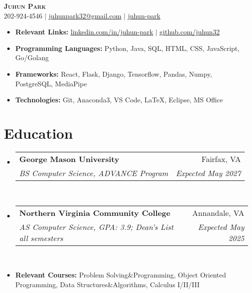 \documentclass[letterpaper,11pt]{article}
\makeatletter
\newcommand{\resumeItem}[1]{
  \item\small{
    {#1 \vspace{-3pt}}
  }
}
\newcommand{\resumeItemThin}[1]{
  \item\small{
    {#1 \vspace{-7pt}}
  }
}
\newcommand{\resumeSubheading}[4]{
    \item
    \begin{tabular*}{0.97\textwidth}[t]{l@{\extracolsep{\fill}}r@{\hspace{-0.2in}}}
        \small{\textbf{#1}} & \small{#2} \\
        \textit{\small#3} & \textit{\small #4} \\
    \end{tabular*}\vspace{-5pt}
}
\newcommand{\resumeSubHeadingListStart}{\begin{itemize}[leftmargin=0.00in, rightmargin=-0.2in, label={}]}
\newcommand{\resumeSubHeadingListEnd}{\end{itemize}\vspace{-7pt}}
\newcommand{\resumeItemListStart}{\begin{itemize}[leftmargin=0.15in, rightmargin=0.15in]}
\newcommand{\resumeItemListEnd}{\end{itemize}\vspace{-7pt}}
\makeatother
\begin{document}

\begin{center}
    \textbf{\Huge \scshape {Juhun Park}} \\ \vspace{1pt}
    \small 202-924-4546 $|$
    \href{mailto:riann3207@gmail.com}{\underline{juhunpark32@gmail.com}} $|$
    \href{https://juhun32.github.io/juhun-park/}{\underline{juhun-park}}
\end{center}

\vspace{-7pt}


\resumeItemListStart
\resumeItemThin{\textbf{Relevant Links: }
    \href{https://linkedin.com/in/juhun-park}{\underline{linkedin.com/in/juhun-park}} $|$
    \href{https://github.com/juhun32}{\underline{github.com/juhun32}}} \\

\resumeItemThin{\textbf{Programming Languages: } {Python, Java, SQL, HTML, CSS, JavaScript, Go/Golang}}\\
\resumeItemThin{\textbf{Frameworks: }{React, Flask, Django, Tensorflow, Pandas, Numpy, PostgreSQL, MediaPipe}}\\
\resumeItemThin{\textbf{Technologies: } {Git, Anaconda3, VS Code, LaTeX, Eclipse, MS Office}}\\
\resumeItemListEnd


\section{Education}
\resumeSubHeadingListStart
\resumeSubheading
{George Mason University}{Fairfax, VA}
{BS Computer Science, ADVANCE Program}{Expected May 2027}\\

\resumeSubheading
{Northern Virginia Community College}{Annandale, VA}
{AS Computer Science, GPA: 3.9; Dean's List all semesters}{Expected May 2025} \\

\resumeItem{\textbf{Relevant Courses: }{Problem Solving\&Programming, Object Oriented Programming, Data Structures\&Algorithms, Calculus I/II/III}}
\resumeSubHeadingListEnd


\end{document}
